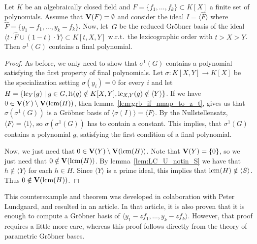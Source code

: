 \begin{theorem}
  Let $K$ be an algebraically closed field and $F = \{f_{1}, \dots, f_{k}\} \subset K[X]$ a finite set of polynomials. Assume that $\operatorname{\mathbf V}(F) = \emptyset$ and consider the ideal $I = \langle \hat F \rangle$ where $\hat F = \{y_{1} - f_{1}, \dots, y_{k} - f_{k}\}$. Now, let $\,G$ be the reduced Gröbner basis of the ideal $\langle t \cdot \hat F \cup (1 - t) \cdot Y \rangle \subset K[t, X, Y]$ w.r.t.\ the lexicographic order with $t > X > Y$. Then
  $\sigma^{1}(G)$ contains a final polynomial.
\end{theorem}
\begin{proof}
  As before, we only need to show that $\sigma^{1}(G)$ contains a polynomial satisfying the first property of final polynomials. Let $\sigma : K[X, Y] \to K[X]$ be the specialization setting $\sigma(y_{i}) = 0$ for every $i$ and let $H = \{\operatorname{lc}_{Y}(g) \mid g \in G, \operatorname{lt}(g) \notin K[X, Y], \operatorname{lc}_{X, Y}(g) \notin \langle Y \rangle\}$. If we have $0 \in \operatorname{\mathbf V}(Y) \setminus \operatorname{\mathbf V}(\operatorname{lcm}(H))$, then lemma~\ref{lem:grb_if_nmap_to_z_t}, gives us that $\sigma(\sigma^{1}(G))$ is a Gröbner basis of $\langle \sigma(I) \rangle = \langle F \rangle$. By the Nullstellensatz, $\langle F \rangle = \langle 1 \rangle$, so $\sigma(\sigma^{1}(G))$ has to contain a constant. This implies, that $\sigma^{1}(G)$ contains a polynomial $g$, satisfying the first condition of a final polynomial.

  Now, we just need that $0 \in \operatorname{\mathbf V}(Y) \setminus \operatorname{\mathbf V}(\operatorname{lcm}(H))$. Note that $\operatorname{\mathbf V}(Y) = \{0\}$, so we just need that $0 \notin \operatorname{\mathbf V}(\operatorname{lcm}(H))$. By lemma~\ref{lem:LC_U_notin_S} we have that $h \notin \langle Y \rangle$ for each $h \in H$. Since $\langle Y \rangle$ is a prime ideal, this implies that $\operatorname{lcm}(H) \notin \langle S \rangle$. Thus $0 \notin \operatorname{\mathbf V}(\operatorname{lcm}(H))$.
\end{proof}

This counterexample and theorem was developed in colaboration with Peter Lundgaard, and resulted in an article\cite{Lundgaard_Poulsen}. In that article, it is also proven that it is enough to compute a Gröbner basis of $\langle y_{1} - z f_{1}, \dots, y_{k} - z f_{k} \rangle$. However, that proof requires a little more care, whereas this proof follows directly from the theory of parametric Gröbner bases.
